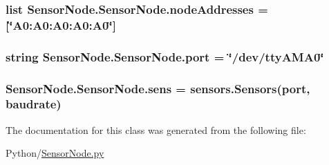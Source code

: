 \subsubsection[{\texorpdfstring{node\+Addresses}{nodeAddresses}}]{\setlength{\rightskip}{0pt plus 5cm}list Sensor\+Node.\+Sensor\+Node.\+node\+Addresses = \mbox{[}\char`\"{}A0\+:\+A0\+:\+A0\+:\+A0\+:\+A0\char`\"{}\mbox{]}\hspace{0.3cm}{\ttfamily [static]}}\hypertarget{classSensorNode_1_1SensorNode_a17be4a277b9bfdd041ec006b462d497c}{}\label{classSensorNode_1_1SensorNode_a17be4a277b9bfdd041ec006b462d497c}
\subsubsection[{\texorpdfstring{port}{port}}]{\setlength{\rightskip}{0pt plus 5cm}string Sensor\+Node.\+Sensor\+Node.\+port = \char`\"{}/dev/tty\+A\+M\+A0\char`\"{}\hspace{0.3cm}{\ttfamily [static]}}\hypertarget{classSensorNode_1_1SensorNode_a94712cd1b0bf09fa4cd3de94ca666575}{}\label{classSensorNode_1_1SensorNode_a94712cd1b0bf09fa4cd3de94ca666575}
\subsubsection[{\texorpdfstring{sens}{sens}}]{\setlength{\rightskip}{0pt plus 5cm}Sensor\+Node.\+Sensor\+Node.\+sens = {\bf sensors.\+Sensors}({\bf port}, {\bf baudrate})\hspace{0.3cm}{\ttfamily [static]}}\hypertarget{classSensorNode_1_1SensorNode_ad8aec254c15c97a8b5c709480f31b2bb}{}\label{classSensorNode_1_1SensorNode_ad8aec254c15c97a8b5c709480f31b2bb}


The documentation for this class was generated from the following file\+:\begin{DoxyCompactItemize}
\item 
Python/\hyperlink{SensorNode_8py}{Sensor\+Node.\+py}\end{DoxyCompactItemize}
